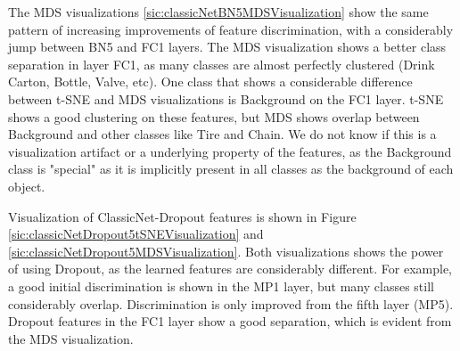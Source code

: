 The MDS visualizations \ref{sic:classicNetBN5MDSVisualization} show the same pattern of increasing improvements of feature discrimination, with a considerably jump between BN5 and FC1 layers. The MDS visualization shows a better class separation in layer FC1, as many classes are almost perfectly clustered (Drink Carton, Bottle, Valve, etc). One class that shows a considerable difference between t-SNE and MDS visualizations is Background on the FC1 layer. t-SNE shows a good clustering on these features, but MDS shows overlap between Background and other classes like Tire and Chain. We do not know if this is a visualization artifact or a underlying property of the features, as the Background class is "special" as it is implicitly present in all classes as the background of each object.

Visualization of ClassicNet-Dropout features is shown in Figure \ref{sic:classicNetDropout5tSNEVisualization} and \ref{sic:classicNetDropout5MDSVisualization}. Both visualizations shows the power of using Dropout, as the learned features are considerably different. For example, a good initial discrimination is shown in the MP1 layer, but many classes still considerably overlap. Discrimination is only improved from the fifth layer (MP5).
Dropout features in the FC1 layer show a good separation, which is evident from the MDS visualization.

